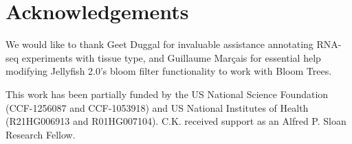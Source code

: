 \documentclass[11pt]{article}
\begin{document}
\section*{Acknowledgements}

We would like to thank Geet Duggal for invaluable assistance annotating RNA-seq experiments with tissue type, and Guillaume Mar\c{c}ais for essential help modifying Jellyfish 2.0's bloom filter functionality to work with Bloom Trees. 

This work has been partially funded by the US National Science Foundation (CCF-1256087 and CCF-1053918) and US National Institutes of Health (R21HG006913 and R01HG007104). C.K. received support as an Alfred P. Sloan Research Fellow. 
\end{document}
